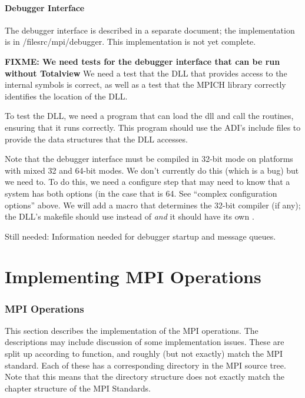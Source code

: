 \documentclass{article}
\def\fixme#1{\marginpar{FIXME:}\textbf{FIXME: #1}}
\begin{document}

\subsection{Debugger Interface}
\label{sec:debug-interface}

The debugger interface is described in a separate document; the
implementation is in /file{src/mpi/debugger}.  This implementation is
not yet complete.

\fixme{We need tests for the debugger interface that can be run
  without Totalview}
We need a test that the DLL that provides access to the internal
symbols is correct, as well as a test that the MPICH library correctly
identifies the location of the DLL.

To test the DLL, we need a program  that can
load the dll and call the routines, ensuring that it runs correctly.
This program should use the ADI's include files to provide the data
structures that the DLL accesses.

Note that the debugger interface must be compiled in 32-bit mode on
platforms with mixed 32 and 64-bit modes.  We don't currently do this
(which is a bug) but we need to.  To do this, we need a configure step
that may need to know that a system has both options (in the case that
 is 64.  See ``complex configuration
options'' above.  We will add a macro  that
determines the 32-bit compiler (if any); the DLL's makefile should use
 instead of  \emph{and} it should have its own
. 

Still needed: Information needed for debugger startup and message
queues.

\part{Implementing MPI Operations}
\section{MPI Operations}
\label{sec:mpi-operations}
This section describes the implementation of the MPI operations.  The
descriptions may include discussion of some implementation issues.
These are split up according to function, and roughly (but not
exactly) match the MPI standard.  Each of these has a corresponding
directory in the MPI source tree.  Note that this means that the
directory structure does not exactly match the chapter structure of
the MPI Standards.
\end{document}
